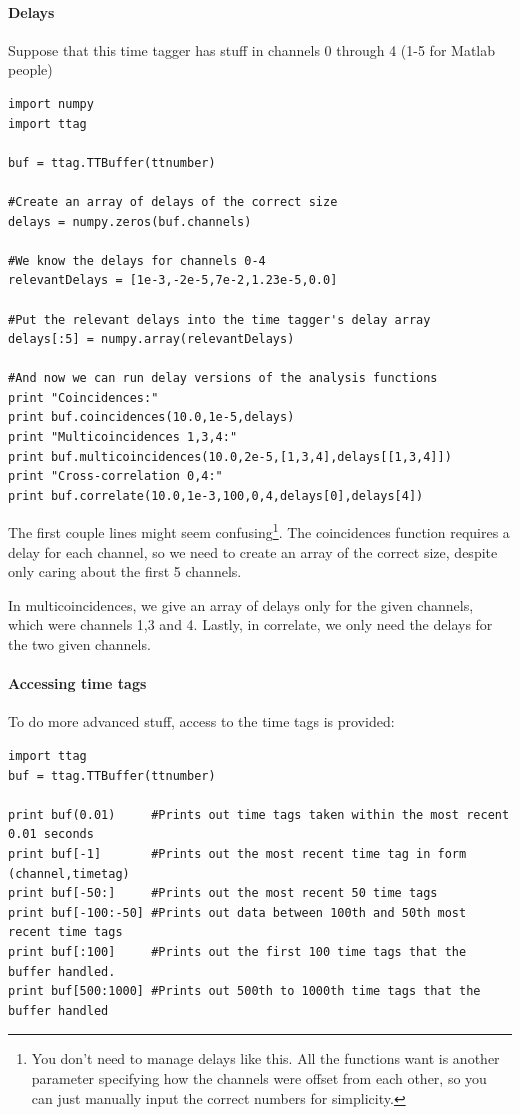 \documentclass[10pt]{article}
\begin{document}
\paragraph{Delays}
Suppose that this time tagger has stuff in channels 0 through 4 (1-5 for Matlab people)

\begin{verbatim}
import numpy
import ttag

buf = ttag.TTBuffer(ttnumber)

#Create an array of delays of the correct size
delays = numpy.zeros(buf.channels)

#We know the delays for channels 0-4
relevantDelays = [1e-3,-2e-5,7e-2,1.23e-5,0.0]

#Put the relevant delays into the time tagger's delay array
delays[:5] = numpy.array(relevantDelays)

#And now we can run delay versions of the analysis functions
print "Coincidences:"
print buf.coincidences(10.0,1e-5,delays)
print "Multicoincidences 1,3,4:"
print buf.multicoincidences(10.0,2e-5,[1,3,4],delays[[1,3,4]])
print "Cross-correlation 0,4:"
print buf.correlate(10.0,1e-3,100,0,4,delays[0],delays[4])
\end{verbatim}

The first couple lines might seem confusing\footnote{You don't need to manage delays like this. All the functions want is another parameter specifying
how the channels were offset from each other, so you can just manually input the correct numbers for simplicity.}. The coincidences function requires a delay for each channel,
so we need to create an array of the correct size, despite only caring about the first 5 channels.

In multicoincidences, we give an array of delays only for the given channels, which were channels 1,3 and 4. Lastly, in correlate, we only need the delays for the two given channels.

\paragraph{Accessing time tags}

To do more advanced stuff, access to the time tags is provided:

\begin{verbatim}
import ttag
buf = ttag.TTBuffer(ttnumber)

print buf(0.01)     #Prints out time tags taken within the most recent 0.01 seconds
print buf[-1]       #Prints out the most recent time tag in form (channel,timetag)
print buf[-50:]     #Prints out the most recent 50 time tags
print buf[-100:-50] #Prints out data between 100th and 50th most recent time tags
print buf[:100]     #Prints out the first 100 time tags that the buffer handled.
print buf[500:1000] #Prints out 500th to 1000th time tags that the buffer handled

\end{verbatim}
\end{document}
